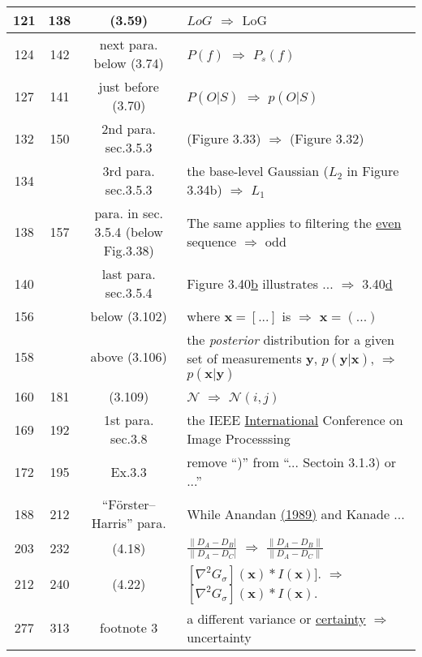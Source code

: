 \documentclass[10pt]{article}
\begin{document}
\begin{tabular}{|c|c|c|l|}
121 & 138 & (3.59) & $LoG$ $\Rightarrow$ $\mathrm{LoG}$ \\\hline
124 & 142 & next para. below (3.74) & $P(f)$ $\Rightarrow$ $P_s(f)$ \\\hline
127 & 141 & just before (3.70) & $P(O|S)$ $\Rightarrow$ $p(O|S)$ \\\hline
132 & 150 & 2nd para. sec.3.5.3 & (Figure 3.33) $\Rightarrow$ (Figure 3.32)  \\\hline
134 &        & 3rd para. sec.3.5.3 & the base-level Gaussian (\underline{$L_2$} in Figure 3.34b) $\Rightarrow$ $L_1$ \\\hline
138 & 157 &  para. in sec. 3.5.4 (below Fig.3.38) &  The same applies to filtering the \underline{even} sequence    $\Rightarrow$  odd \\\hline
140 &       & last para. sec.3.5.4 & Figure 3.40\underline{b} illustrates ... $\Rightarrow$ 3.40\underline{d} \\\hline
156 &      & below (3.102) & where $\boldsymbol{x} = [ ... ] $ is $\Rightarrow$ $\boldsymbol{x} = ( ... ) $ \\\hline
158 &       & above (3.106) & the \textit{posterior} distribution for a given set of measurements $\boldsymbol{y}$, \underline{$p(\boldsymbol{y}|\boldsymbol{x})$}, $\Rightarrow$ $p(\boldsymbol{x}|\boldsymbol{y})$ \\\hline
160 & 181 & (3.109) & $\mathcal{N}$  $\Rightarrow$  $\mathcal{N}(i,j)$ \\\hline
169 & 192 & 1st para. sec.3.8 &  the IEEE \underline{International} Conference on Image Processsing \\\hline
172 & 195 & Ex.3.3 & remove ``)'' from ``... Sectoin 3.1.3) or ...'' \\\hline
188 & 212 & ``F\"{o}rster--Harris'' para. & While Anandan \underline{(1989)} and Kanade ... \\\hline
203 & 232 & (4.18) & $\frac{\| D_A - D_B|}{\| D_A - D_C |}$ $\Rightarrow$  $\frac{\| D_A - D_B \|}{\| D_A - D_C \|}$  \\\hline
212 & 240 & (4.22) & $[ \nabla ^2 G_\sigma ] (\boldsymbol{x} ) * I(\boldsymbol{x})].$ $\Rightarrow$ $[ \nabla ^2 G_\sigma ] (\boldsymbol{x} ) * I(\boldsymbol{x}).$ \\\hline
277 & 313 & footnote 3 & a different variance or \underline{certainty} $\Rightarrow$ uncertainty \\\hline

\end{tabular}
\end{document}
